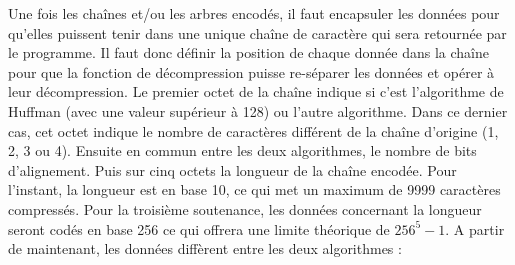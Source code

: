         Une fois les chaînes et/ou les arbres encodés, il faut encapsuler les données pour qu'elles puissent tenir dans une unique chaîne de caractère qui sera retournée par le programme. Il faut donc définir la position de chaque donnée dans la chaîne pour que la fonction de décompression puisse re-séparer les données et opérer à leur décompression. Le premier octet de la chaîne indique si c'est l'algorithme de Huffman (avec une valeur supérieur à 128) ou l'autre algorithme. Dans ce dernier cas, cet octet indique le nombre de caractères différent de la chaîne d'origine (1, 2, 3 ou 4). Ensuite en commun entre les deux algorithmes, le nombre de bits d'alignement. Puis sur cinq octets la longueur de la chaîne encodée. Pour l'instant, la longueur est en base 10, ce qui met un maximum de 9999 caractères compressés. Pour la troisième soutenance, les données concernant la longueur seront codés en base 256 ce qui offrera une limite théorique de $256^{5} - 1$. A partir de maintenant, les données diffèrent entre les deux algorithmes :\newpage
